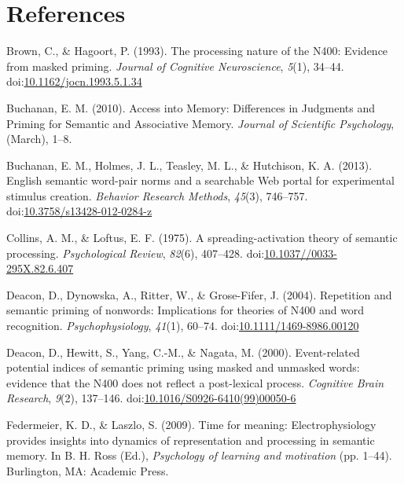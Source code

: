\documentclass[english,man]{apa6}
\theoremstyle{definition}
\theoremstyle{definition}
\theoremstyle{remark}
\begin{document}
\newpage

\section{References}\label{references}

\setlength{\parindent}{-0.5in} \setlength{\leftskip}{0.5in}

\hypertarget{refs}{}
\hypertarget{ref-Brown1993}{}
Brown, C., \& Hagoort, P. (1993). The processing nature of the N400:
Evidence from masked priming. \emph{Journal of Cognitive Neuroscience},
\emph{5}(1), 34--44.
doi:\href{https://doi.org/10.1162/jocn.1993.5.1.34}{10.1162/jocn.1993.5.1.34}

\hypertarget{ref-Buchanan2010}{}
Buchanan, E. M. (2010). Access into Memory: Differences in Judgments and
Priming for Semantic and Associative Memory. \emph{Journal of Scientific
Psychology}, (March), 1--8.

\hypertarget{ref-Buchanan2013}{}
Buchanan, E. M., Holmes, J. L., Teasley, M. L., \& Hutchison, K. A.
(2013). English semantic word-pair norms and a searchable Web portal for
experimental stimulus creation. \emph{Behavior Research Methods},
\emph{45}(3), 746--757.
doi:\href{https://doi.org/10.3758/s13428-012-0284-z}{10.3758/s13428-012-0284-z}

\hypertarget{ref-Collins1975}{}
Collins, A. M., \& Loftus, E. F. (1975). A spreading-activation theory
of semantic processing. \emph{Psychological Review}, \emph{82}(6),
407--428.
doi:\href{https://doi.org/10.1037//0033-295X.82.6.407}{10.1037//0033-295X.82.6.407}

\hypertarget{ref-Deacon2004}{}
Deacon, D., Dynowska, A., Ritter, W., \& Grose-Fifer, J. (2004).
Repetition and semantic priming of nonwords: Implications for theories
of N400 and word recognition. \emph{Psychophysiology}, \emph{41}(1),
60--74.
doi:\href{https://doi.org/10.1111/1469-8986.00120}{10.1111/1469-8986.00120}

\hypertarget{ref-Deacon2000}{}
Deacon, D., Hewitt, S., Yang, C.-M., \& Nagata, M. (2000). Event-related
potential indices of semantic priming using masked and unmasked words:
evidence that the N400 does not reflect a post-lexical process.
\emph{Cognitive Brain Research}, \emph{9}(2), 137--146.
doi:\href{https://doi.org/10.1016/S0926-6410(99)00050-6}{10.1016/S0926-6410(99)00050-6}

\hypertarget{ref-Federmeier2009}{}
Federmeier, K. D., \& Laszlo, S. (2009). Time for meaning:
Electrophysiology provides insights into dynamics of representation and
processing in semantic memory. In B. H. Ross (Ed.), \emph{Psychology of
learning and motivation} (pp. 1--44). Burlington, MA: Academic Press.
\end{document}
